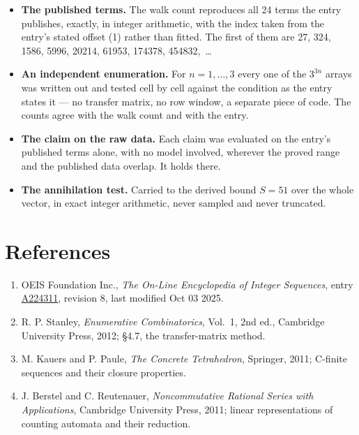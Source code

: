 \documentclass[11pt]{article}
\theoremstyle{definition}
\begin{document}
\begin{itemize}

\item {\bfseries The published terms.} The walk count reproduces all 24 terms the entry publishes, exactly, in integer arithmetic, with the index taken from the entry's stated offset (1) rather than fitted. The first of them are 27, 324, 1586, 5996, 20214, 61953, 174378, 454832,~\dots

\item {\bfseries An independent enumeration.} For $n = 1,\dots,3$ every one of the $3^{3n}$ arrays was written out and tested cell by cell against the condition as the entry states it --- no transfer matrix, no row window, a separate piece of code. The counts agree with the walk count and with the entry.

\item {\bfseries The claim on the raw data.} Each claim was evaluated on the entry's published terms alone, with no model involved, wherever the proved range and the published data overlap. It holds there.

\item {\bfseries The annihilation test.} Carried to the derived bound $S = 51$ over the whole vector, in exact integer arithmetic, never sampled and never truncated.

\end{itemize}

\section{References}

\begin{enumerate}

\item OEIS Foundation Inc., \emph{The On-Line Encyclopedia of Integer Sequences}, entry \href{https://oeis.org/A224311}{A224311}, revision 8, last modified Oct 03 2025.

\item R. P. Stanley, \emph{Enumerative Combinatorics}, Vol.~1, 2nd ed., Cambridge University Press, 2012; \S4.7, the transfer-matrix method.

\item M. Kauers and P. Paule, \emph{The Concrete Tetrahedron}, Springer, 2011; C-finite sequences and their closure properties.

\item J. Berstel and C. Reutenauer, \emph{Noncommutative Rational Series with Applications}, Cambridge University Press, 2011; linear representations of counting automata and their reduction.

\end{enumerate}
\end{document}
